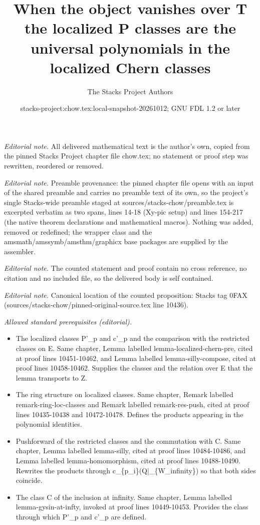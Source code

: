 \documentclass[10pt,a4paper]{amsart}
\title{When the object vanishes over T the localized P classes are the universal polynomials in the localized Chern classes}
\author{The Stacks Project Authors}
\date{stacks-project:chow.tex:local-snapshot-20261012; GNU FDL 1.2 or later}
\theoremstyle{plain}
\theoremstyle{definition}
\theoremstyle{remark}
\numberwithin{equation}{subsection}
\begin{document}
\maketitle
\noindent\textit{Editorial note.} All delivered mathematical text is the author's own, copied from the pinned Stacks Project chapter file chow.tex; no statement or proof step was rewritten, reordered or removed.\par\medskip
\noindent\textit{Editorial note.} Preamble provenance: the pinned chapter file opens with an input of the shared preamble and carries no preamble text of its own, so the project's single Stacks-wide preamble staged at sources/stacks-chow/preamble.tex is excerpted verbatim as two spans, lines 14-18 (Xy-pic setup) and lines 154-217 (the native theorem declarations and mathematical macros). Nothing was added, removed or redefined; the wrapper class and the amsmath/amssymb/amsthm/graphicx base packages are supplied by the assembler.\par\medskip
\noindent\textit{Editorial note.} The counted statement and proof contain no cross reference, no citation and no included file, so the delivered body is self contained.\par\medskip
\noindent\textit{Editorial note.} Canonical location of the counted proposition: Stacks tag 0FAX (sources/stacks-chow/pinned-original-source.tex line 10436).\par\medskip
\noindent\textit{Allowed standard prerequisites (editorial).}\begin{itemize}
\item The localized classes P'\_p and c'\_p and the comparison with the restricted classes on E. Same chapter, Lemma labelled lemma-localized-chern-pre, cited at proof lines 10451-10462, and Lemma labelled lemma-silly-compose, cited at proof lines 10458-10462. Supplies the classes and the relation over E that the lemma transports to Z.
\item The ring structure on localized classes. Same chapter, Remark labelled remark-ring-loc-classes and Remark labelled remark-res-push, cited at proof lines 10435-10438 and 10472-10478. Defines the products appearing in the polynomial identities.
\item Pushforward of the restricted classes and the commutation with C. Same chapter, Lemma labelled lemma-silly, cited at proof lines 10484-10486, and Lemma labelled lemma-homomorphism, cited at proof lines 10488-10490. Rewrites the products through c\_\{p\_i\}(Q|\_\{W\_infinity\}) so that both sides coincide.
\item The class C of the inclusion at infinity. Same chapter, Lemma labelled lemma-gysin-at-infty, invoked at proof lines 10449-10453. Provides the class through which P'\_p and c'\_p are defined.
\end{itemize}\medskip
\end{document}
